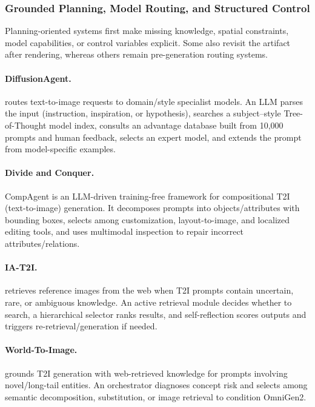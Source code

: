 \subsubsection{Grounded Planning, Model Routing, and Structured Control}
Planning-oriented systems first make missing knowledge, spatial constraints, model capabilities, or control variables explicit. Some also revisit the artifact after rendering, whereas others remain pre-generation routing systems.

\paragraph{DiffusionAgent.}
 routes text-to-image requests to domain/style specialist models. An LLM parses the input (instruction, inspiration, or hypothesis), searches a subject–style Tree-of-Thought model index, consults an advantage database built from 10,000 prompts and human feedback, selects an expert model, and extends the prompt from model-specific examples. ~\cite{qin2024diffusionagent}

\paragraph{Divide and Conquer.}
CompAgent is an LLM-driven training-free framework for compositional T2I (text-to-image) generation. It decomposes prompts into objects/attributes with bounding boxes, selects among customization, layout-to-image, and localized editing tools, and uses multimodal inspection to repair incorrect attributes/relations. ~\cite{wang2024divide}

\paragraph{IA-T2I.}
 retrieves reference images from the web when T2I prompts contain uncertain, rare, or ambiguous knowledge. An active retrieval module decides whether to search, a hierarchical selector ranks results, and self-reflection scores outputs and triggers re-retrieval/generation if needed. ~\cite{li2025iat2i}

\paragraph{World-To-Image.}
 grounds T2I generation with web-retrieved knowledge for prompts involving novel/long-tail entities. An orchestrator diagnoses concept risk and selects among semantic decomposition, substitution, or image retrieval to condition OmniGen2. ~\cite{avg251004201}

